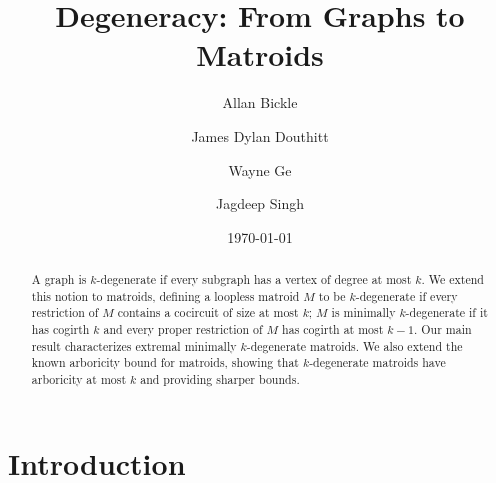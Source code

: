 \documentclass{amsart}
\title{Degeneracy: From Graphs to Matroids}
\theoremstyle{definition}
\theoremstyle{remark}
\numberwithin{equation}{section}
\begin{document}
\author[Bickle]{Allan Bickle}
\address{Department of Mathematics\\
Purdue University, West Lafayette, Indiana}




\author[Douthitt]{James Dylan Douthitt}
\address{Department of Mathematics\\
Syracuse University, Syracuse, New York}

\author[Ge]{Wayne Ge}
\address{Mathematics Department\\
Louisiana State University\\
Baton Rouge, Louisiana}

\author[Singh]{Jagdeep Singh}
\address{Department of Mathematics and Statistics\\
Mississippi State University\\
Starkville, Mississippi}



\date{\today}

\begin{abstract}
A graph is $k$-degenerate if every subgraph has a vertex of degree at most $k$. We extend this notion to matroids, defining a loopless matroid $M$ to be $k$-degenerate if every restriction of $M$ contains a cocircuit of size at most $k$; $M$ is minimally $k$-degenerate if it has cogirth $k$ and every proper restriction of $M$ has cogirth at most $k-1$. Our main result characterizes extremal minimally $k$-degenerate matroids. We also extend the known arboricity bound for matroids, showing that $k$-degenerate matroids have arboricity at most $k$ and providing sharper bounds.
\end{abstract}

\maketitle

\section{Introduction}
\end{document}
